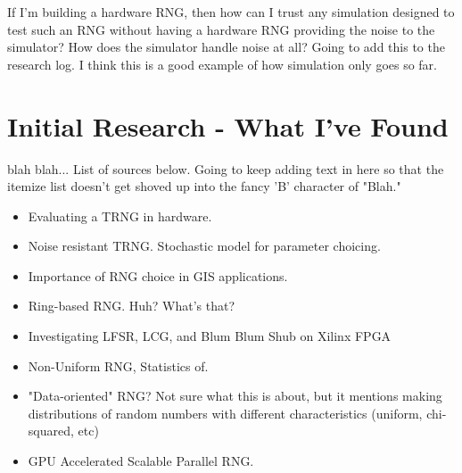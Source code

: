 \documentclass[journal]{IEEEtran}
\begin{document}
If I'm building a hardware RNG, then how can I trust any simulation designed
to test such an RNG without having a hardware RNG providing the noise to
the simulator? How does the simulator handle noise at all? Going to add
this to the research log. I think this is a good example of how simulation
only goes so far.


\section{Initial Research - What I've Found}

 blah blah... List of sources below. Going to keep 
adding text in here so that the itemize list doesn't get shoved up into 
the fancy 'B' character of "Blah."

\begin{itemize}
\item
\cite{000321520700011n.d.} Evaluating a TRNG in hardware.
\item
\cite{000322026900007n.d.} Noise resistant TRNG. Stochastic model for parameter choicing.
\item
\cite{6082794820110401} Importance of RNG choice in GIS applications.
\item
\cite{6102549620110515} Ring-based RNG. Huh? What's that?
\item
\cite{8288132620110601} Investigating LFSR, LCG, and Blum Blum Shub on 
Xilinx FPGA
\item
\cite{8704557320120101} Non-Uniform RNG, Statistics of.
\item
\cite{8762674520130201} "Data-oriented" RNG? Not sure what this is about, but it mentions 
making distributions of random numbers with different characteristics (uniform, chi-squared, 
etc)
\item
\cite{000315974100018n.d.} GPU Accelerated Scalable Parallel RNG.
\end{itemize}

{}

\end{document}
